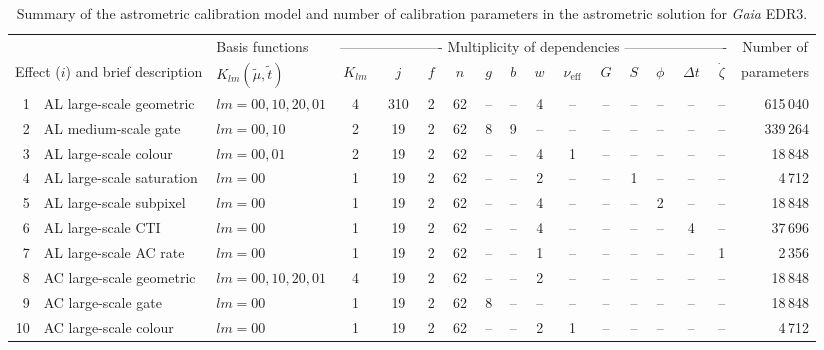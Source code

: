 \documentclass[longauth]{aa} %
\begin{document}
 
\begin{table}[t]
\caption{Summary of the astrometric calibration model and number of calibration
parameters in the astrometric solution for \textit{Gaia} EDR3.\label{tab:cal}}
\small
\begin{tabular}{rllcccccccccccccr}
\hline\hline
\noalign{\smallskip}
&& \multicolumn{1}{l}{Basis functions} 
& \multicolumn{13}{c}{---------------------- Multiplicity of dependencies ----------------------} & 
\multicolumn{1}{c}{Number of} \\ 
\multicolumn{2}{l}{Effect ($i$) and brief description} & 
\multicolumn{1}{l}{$K_{lm}(\tilde{\mu},\tilde{t})$} & \multicolumn{1}{c}{$K_{lm}$} 
& \multicolumn{1}{c}{$j$} & $f$ & \multicolumn{1}{c}{$n$} & 
$g$ & $b$ & $w$ & \multicolumn{1}{c}{$\nu_\text{eff}$} & $G$ & $S$ & $\phi$ 
& \multicolumn{1}{c}{$\Delta t$} & $\dot{\zeta}$ &
\multicolumn{1}{c}{parameters} \\
\noalign{\smallskip}
\hline
\noalign{\smallskip}
1& AL large-scale geometric & $lm=00,10,20,01$ & 4 & 310 & 2 & 62 & -- & -- & 4 & -- & -- & -- & -- & -- & -- &  615\,040\\ 
2& AL medium-scale gate & $lm=00,10$ & 2 & 19 & 2 & 62 & 8 & 9 & -- & -- & -- & -- & -- & -- & -- & 339\,264 \\ 
3& AL large-scale colour & $lm=00,01$ & 2 & 19 & 2 & 62 & -- & -- & 4 & 1 & -- & -- & -- & -- & -- & 18\,848 \\ 
4& AL large-scale saturation & $lm=00$ & 1 & 19 & 2 & 62 & -- & -- & 2 & -- & -- & 1 & -- & -- & -- & 4\,712 \\ 
5& AL large-scale subpixel & $lm=00$ & 1 & 19 & 2 & 62 & -- & -- & 4 & -- & -- & -- & 2 & -- & -- & 18\,848 \\ 
6& AL large-scale CTI & $lm=00$ & 1 & 19 & 2 & 62 & -- & -- & 4 & -- & -- & -- & -- & 4 & -- &  37\,696\\ 
7& AL large-scale AC rate & $lm=00$ & 1 & 19 & 2 & 62 & -- & -- & 1 & -- & -- & -- & -- & -- & 1 &  2\,356\\ 
\noalign{\smallskip}
\hline
\noalign{\smallskip}
8& AC large-scale geometric & $lm=00,10,20,01$ & 4 & 19 & 2 & 62 & -- & -- & 2 & -- & -- & -- & -- & -- & -- &  18\,848\\ 
9& AC large-scale gate & $lm=00$ & 1 & 19 & 2 & 62 & 8 & -- & -- & -- & -- & -- & -- & -- & -- & 18\,848 \\ 
10& AC large-scale colour & $lm=00$ & 1 & 19 & 2 & 62 & -- & -- & 2 & 1 & -- & -- & -- & -- & -- & 4\,712 \\ 

\end{tabular}
\end{table}
\end{document}
